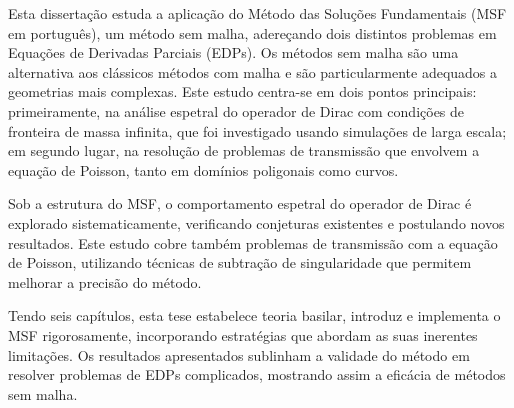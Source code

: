 \acresetall
\noindent
Esta dissertação estuda a aplicação do Método das Soluções Fundamentais (MSF em português), um método sem malha, adereçando dois distintos problemas em Equações de Derivadas Parciais (EDPs). Os métodos sem malha são uma alternativa aos clássicos métodos com malha e são particularmente adequados a geometrias mais complexas. Este estudo centra-se em dois pontos principais: primeiramente, na análise espetral do operador de Dirac com condições de fronteira de massa infinita, que foi investigado usando simulações de larga escala; em segundo lugar, na resolução de problemas de transmissão que envolvem a equação de Poisson, tanto em domínios poligonais como curvos.

Sob a estrutura do MSF, o comportamento espetral do operador de Dirac é explorado sistematicamente, verificando conjeturas existentes e postulando novos resultados. Este estudo cobre também problemas de transmissão com a equação de Poisson, utilizando técnicas de subtração de singularidade que permitem melhorar a precisão do método.

Tendo seis capítulos, esta tese estabelece teoria basilar, introduz e implementa o MSF rigorosamente, incorporando estratégias que abordam as suas inerentes limitações. Os resultados apresentados sublinham a validade do método em resolver problemas de EDPs complicados, mostrando assim a eficácia de métodos sem malha.
